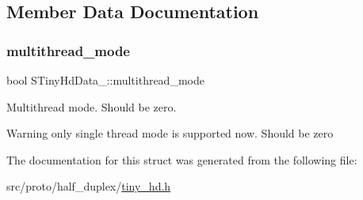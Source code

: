 \subsection{Member Data Documentation}
\mbox{\label{structSTinyHdData___afb1a42e064291b2775024b20d4c9eb79}} 
\subsubsection{\texorpdfstring{multithread\+\_\+mode}{multithread\_mode}}
{\footnotesize\ttfamily bool S\+Tiny\+Hd\+Data\+\_\+\+::multithread\+\_\+mode}



Multithread mode. Should be zero. 

\begin{DoxyWarning}{Warning}
only single thread mode is supported now. Should be zero 
\end{DoxyWarning}


The documentation for this struct was generated from the following file\+:\begin{DoxyCompactItemize}
\item 
src/proto/half\+\_\+duplex/\hyperlink{tiny__hd_8h}{tiny\+\_\+hd.\+h}\end{DoxyCompactItemize}
